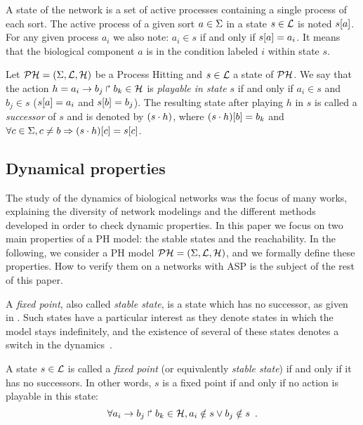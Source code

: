 A state of the network is a set of active processes containing a single process of each sort.
The active process of a given sort $a \in \Sigma$ in a state $s \in \mathcal{L}$
is noted ${s[a]}$.
For any given process $a_i$ we also note: $a_i \in s$ if and only if ${s[a]} = a_i$. It means that the biological component $a$ is in the condition labeled $i$ within state $s$.

\begin{definition} 
\label{def:playableAction}
Let $\mathcal{PH} = (\Sigma,\mathcal{L},\mathcal{H})$ be a Process Hitting and $s \in \mathcal{L}$ a state of $\mathcal{PH}$.
We say that the action $h = a_i\rightarrow b_j\Rsh b_k \in \mathcal{H}$
is \emph{playable in state $s$} if and only if
$a_i \in s$ and $b_j \in s$ (\ie ${s[a]} = a_i$ and ${s[b]}=b_j$).
The resulting state after playing $h$ in $s$
is called a \emph{successor} of $s$ and
is denoted by $(s \cdot h)$,
where ${(s \cdot h)[b]} = b_k$ and
$\forall c \in \Sigma, c \neq b \Rightarrow {(s \cdot h)[c]}={s[c]}$.
\end{definition}

\subsection{Dynamical properties}

The study of the dynamics of biological networks was the focus of many works, explaining the diversity of network modelings and the different methods developed in order to check dynamic properties.
In this paper we focus on two main properties of a PH model: the stable states and the reachability.
In the following, we consider a PH model $\mathcal{PH}=(\Sigma,\mathcal{L},\mathcal{H})$,
and we formally define these properties.
How to verify them on a networks with ASP is the subject of the rest of this paper.

A \emph{fixed point}, also called \emph{stable state},
is a state which has no successor,
as given in .
Such states have a particular interest as they denote states in which the model
stays indefinitely,
and the existence of several of these states denotes a switch in the dynamics~\cite{wuensche1998genomic}.

\begin{definition}
\label{def:fixpoint}
  A state $s \in \mathcal{L}$ is called a \emph{fixed point}
  (or equivalently \emph{stable state})
  if and only if it has no successors.
  In other words, $s$ is a fixed point if and only if no action is playable in this state:
  \[\forall a_i\rightarrow b_j\Rsh b_k \in \mathcal{H}, a_i \notin s \vee b_j \notin s \enspace.\]
\end{definition}

